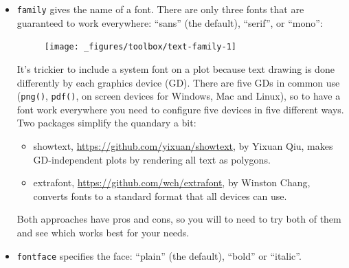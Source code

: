 \begin{itemize}
\item
  \texttt{family} gives the name of a font. There are only three fonts
  that are guaranteed to work everywhere: ``sans'' (the default),
  ``serif'', or ``mono'':

\begin{Shaded}
\begin{Highlighting}[]
\StringTok{ }\NormalTok{(} \NormalTok{, } \NormalTok{:}\NormalTok{, } \NormalTok{(}\NormalTok{, }\NormalTok{, }\NormalTok{))}
\StringTok{ }
\StringTok{  }\NormalTok{(}\NormalTok{(}  
\end{Highlighting}
\end{Shaded}

  \begin{figure}[H]
    \texttt{[image: \_figures/toolbox/text-family-1]}
  \end{figure}

  It's trickier to include a system font on a plot because text drawing
  is done differently by each graphics device (GD). There are five GDs
  in common use (\texttt{png()}, \texttt{pdf()}, on screen devices for
  Windows, Mac and Linux), so to have a font work everywhere you need to
  configure five devices in five different ways. Two packages simplify
  the quandary a bit:

  \begin{itemize}
  \item
    showtext, \url{https://github.com/yixuan/showtext}, by Yixuan Qiu,
    makes GD-independent plots by rendering all text as polygons.
  \item
    extrafont, \url{https://github.com/wch/extrafont}, by Winston Chang,
    converts fonts to a standard format that all devices can use.
  \end{itemize}

  Both approaches have pros and cons, so you will to need to try both of
  them and see which works best for your needs. 
\item
  \texttt{fontface} specifies the face: ``plain'' (the default),
  ``bold'' or ``italic''. 


\end{itemize}
